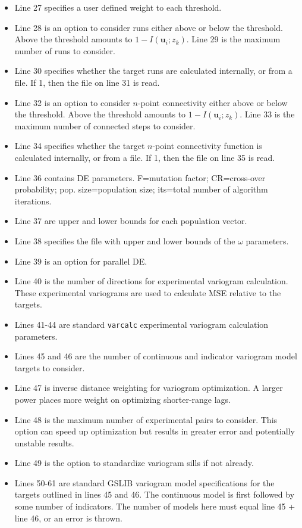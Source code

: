 \begin{itemize}[noitemsep]
   \item Line 27 specifies a user defined weight to each threshold.
   \item Line 28 is an option to consider runs either above or below the threshold. Above the threshold amounts to $1-I(\mathbf{u}_{i}; z_{k})$. Line 29 is the maximum number of runs to consider.
   \item Line 30 specifies whether the target runs are calculated internally, or from a file. If 1, then the file on line 31 is read.
   \item Line 32 is an option to consider $n$-point connectivity either above or below the threshold. Above the threshold amounts to $1-I(\mathbf{u}_{i}; z_{k})$. Line 33 is the maximum number of connected steps to consider.
   \item Line 34 specifies whether the target $n$-point connectivity function is calculated internally, or from a file. If 1, then the file on line 35 is read.
   \item Line 36 contains DE parameters. F=mutation factor; CR=cross-over probability; pop. size=population size; its=total number of algorithm iterations.
   \item Line 37 are upper and lower bounds for each population vector.
   \item Line 38 specifies the file with upper and lower bounds of the $\omega$ parameters.
   \item Line 39 is an option for parallel DE.
   \item Line 40 is the number of directions for experimental variogram calculation. These experimental variograms are used to calculate MSE relative to the targets.
   \item Lines 41-44 are standard \texttt{varcalc} experimental variogram calculation parameters.
   \item Lines 45 and 46 are the number of continuous and indicator variogram model targets to consider.
   \item Line 47 is inverse distance weighting for variogram optimization. A larger power places more weight on optimizing shorter-range lags.
   \item Line 48 is the maximum number of experimental pairs to consider. This option can speed up optimization but results in greater error and potentially unstable results.
   \item Line 49 is the option to standardize variogram sills if not already.
   \item Lines 50-61 are standard GSLIB variogram model specifications for the targets outlined in lines 45 and 46. The continuous model is first followed by some number of indicators. The number of models here must equal line 45 + line 46, or an error is thrown.
\end{itemize}

